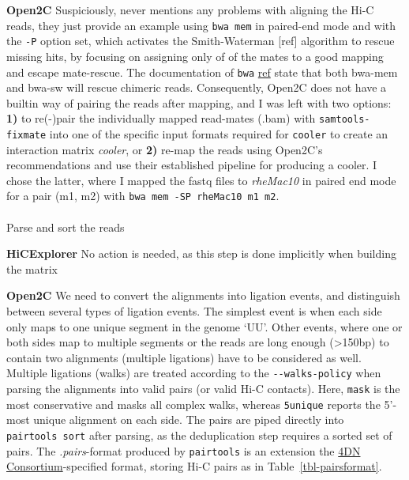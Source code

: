 \documentclass[
  11pt,
  a4paper,
]{scrbook}
\makeatletter
\let\oldparagraph\paragraph
\renewcommand{\paragraph}{
    \@ifstar
      \xxxParagraphStar
      \xxxParagraphNoStar
  }
\newcommand{\xxxParagraphStar}[1]{\oldparagraph*{#1}\mbox{}}
\newcommand{\xxxParagraphNoStar}[1]{\oldparagraph{#1}\mbox{}}
\let\oldemph\emph
\renewcommand\emph[1]{\oldemph{\color{gray}#1}}
\makeatother
\begin{document}
\textbf{Open2C} Suspiciously, \citep{open2c} never mentions any problems
with aligning the Hi-C reads, they just provide an example using
\texttt{bwa\ mem} in paired-end mode and with the \texttt{-P} option
set, which activates the Smith-Waterman {[}ref{]} algorithm to rescue
missing hits, by focusing on assigning only of of the mates to a good
mapping and escape mate-rescue. The documentation of \texttt{bwa}
\href{https://bio-bwa.sourceforge.net}{ref} state that both bwa-mem and
bwa-sw will rescue chimeric reads. Consequently, Open2C does not have a
builtin way of pairing the reads after mapping, and I was left with two
options: \textbf{1)} to re(-)pair the individually mapped read-mates
(.bam) with \texttt{samtools-fixmate} into one of the specific input
formats required for \texttt{cooler} to create an interaction matrix
\emph{cooler}, or \textbf{2)} re-map the reads using Open2C's
recommendations and use their established pipeline for producing a
cooler. I chose the latter, where I mapped the fastq files to
\emph{rheMac10} in paired end mode for a pair (m1, m2) with
\texttt{bwa\ mem\ -SP\ rheMac10\ m1\ m2}.

\paragraph{Parse and sort the reads}\label{parse-and-sort-the-reads}

\textbf{HiCExplorer} No action is needed, as this step is done
implicitly when building the matrix

\textbf{Open2C} We need to convert the alignments into ligation events,
and distinguish between several types of ligation events. The simplest
event is when each side only maps to one unique segment in the genome
`UU'. Other events, where one or both sides map to multiple segments or
the reads are long enough (\textgreater150bp) to contain two alignments
(multiple ligations) have to be considered as well. Multiple ligations
(walks) are treated according to the \texttt{-\/-walks-policy} when
parsing the alignments into valid pairs (or valid Hi-C contacts). Here,
\texttt{mask} is the most conservative and masks all complex walks,
whereas \texttt{5unique} reports the 5'-most unique alignment on each
side. The pairs are piped directly into \texttt{pairtools\ sort} after
parsing, as the deduplication step requires a sorted set of pairs. The
\emph{.pairs}-format produced by \texttt{pairtools} is an extension the
\href{https://data.4dnucleome.org/file-formats/pairs/}{4DN
Consortium}-specified format, storing Hi-C pairs as in
Table~\ref{tbl-pairsformat}.
\end{document}
